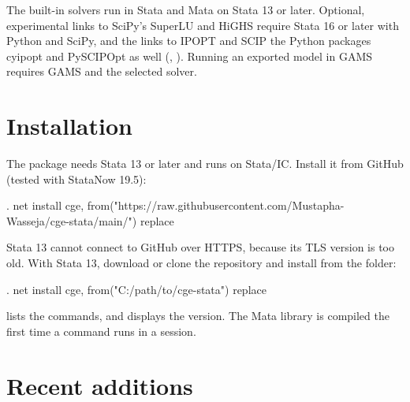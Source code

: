 The built-in solvers run in Stata and Mata on Stata 13 or later. Optional,
experimental links to SciPy's SuperLU and HiGHS require Stata 16 or later
with Python and SciPy, and the links to IPOPT and SCIP the Python packages
cyipopt and PySCIPOpt as well (, ). Running an
exported model in GAMS requires GAMS and the selected solver.

\section{Installation}

The package needs Stata 13 or later and runs on Stata/IC. Install it from
GitHub (tested with StataNow 19.5):
\begin{stcode}
. net install cge, from("https://raw.githubusercontent.com/Mustapha-Wasseja/cge-stata/main/") replace
\end{stcode}
Stata 13 cannot connect to GitHub over HTTPS, because its TLS version is too
old. With Stata 13, download or clone the repository and install from the
folder:
\begin{stcode}
. net install cge, from("C:/path/to/cge-stata") replace
\end{stcode}
 lists the commands, and  displays the version. The
Mata library is compiled the first time a command runs in a session.

\section{Recent additions}

